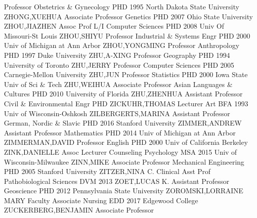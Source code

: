 \documentclass[
]{article}
\begin{document}
\textbar Professor \textbar Obstetrics \& Gynecology \textbar PHD 1995
North Dakota State University \textbar{} 
\textbar ZHONG,XUEHUA \textbar Associate Professor \textbar Genetics
\textbar PHD 2007 Ohio State University \textbar{} 
\textbar ZHOU,JIAZHEN \textbar Assoc Prof L/I \textbar Computer Sciences
\textbar PHD 2008 Univ Of Missouri-St Louis \textbar{} 
\textbar ZHOU,SHIYU \textbar Professor \textbar Industrial \& Systems
Engr \textbar PHD 2000 Univ of Michigan at Ann Arbor \textbar{}
 \textbar ZHOU,YONGMING \textbar Professor
\textbar Anthropology \textbar PHD 1997 Duke University \textbar{}
 \textbar ZHU,A-XING \textbar Professor \textbar Geography
\textbar PHD 1994 University of Toronto \textbar{} 
\textbar ZHU,JERRY \textbar Professor \textbar Computer Sciences
\textbar PHD 2005 Carnegie-Mellon University \textbar{} 
\textbar ZHU,JUN \textbar Professor \textbar Statistics \textbar PHD
2000 Iowa State Univ of Sci \& Tech \textbar{} 
\textbar ZHU,WEIHUA \textbar Associate Professor \textbar Asian
Languages \& Cultures \textbar PHD 2010 University of Florida \textbar{}
 \textbar ZHU,ZHENHUA \textbar Assistant Professor
\textbar Civil \& Environmental Engr \textbar PHD \textbar{}
 \textbar ZICKUHR,THOMAS \textbar Lecturer \textbar Art
\textbar BFA 1993 Univ of Wisconsin-Oshkosh \textbar{} 
\textbar ZILBERGERTS,MARINA \textbar Assistant Professor
\textbar German, Nordic \& Slavic \textbar PHD 2016 Stanford University
\textbar{}  \textbar ZIMMER,ANDREW \textbar Assistant
Professor \textbar Mathematics \textbar PHD 2014 Univ of Michigan at Ann
Arbor \textbar{}  \textbar ZIMMERMAN,DAVID
\textbar Professor \textbar English \textbar PHD 2000 Univ of California
Berkeley \textbar{}  \textbar ZINK,DANIELLE \textbar Assoc
Lecturer \textbar Counseling Psychology \textbar MSA 2015 Univ of
Wisconsin-Milwaukee \textbar{}  \textbar ZINN,MIKE
\textbar Associate Professor \textbar Mechanical Engineering
\textbar PHD 2005 Stanford University \textbar{} 
\textbar ZITZER,NINA C. \textbar Clinical Asst Prof
\textbar Pathobiological Sciences \textbar DVM 2013 \textbar{}
 \textbar ZOET,LUCAS K. \textbar Assistant Professor
\textbar Geoscience \textbar PHD 2012 Pennsylvania State University
\textbar{}  \textbar ZOROMSKI,LORRAINE MARY \textbar Faculty
Associate \textbar Nursing \textbar EDD 2017 Edgewood College \textbar{}
 \textbar ZUCKERBERG,BENJAMIN \textbar Associate Professor
\end{document}
